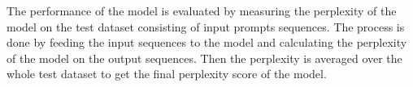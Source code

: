 The performance of the model is evaluated by measuring the perplexity of the model on the test dataset consisting of input prompts sequences. The process is done by feeding the input sequences to the model and calculating the perplexity of the model on the output sequences. Then the perplexity is averaged over the whole test dataset to get the final perplexity score of the model. \par
